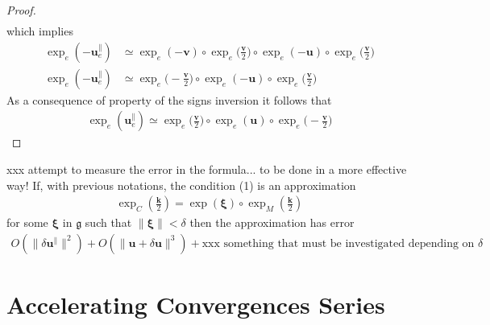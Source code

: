\begin{proof}
\begin{align*}
	\end{align*}
	which implies
	\begin{align*}
	\exp_{e}(-\mathbf{u}_{e}^{\parallel}) 
	&\simeq
	\exp_{e}(-\mathbf{v}) 
	\circ \exp_{e}\big(\frac{\mathbf{v}}{2}\big)   
	\circ  \exp_{e}(-\mathbf{u}) 
	\circ \exp_{e}\big(\frac{\mathbf{v}}{2}\big)
	\\
	\exp_{e}(-\mathbf{u}_{e}^{\parallel}) 
	&\simeq
	\exp_{e}\big(-\frac{\mathbf{v}}{2}\big)   
	\circ  \exp_{e}(-\mathbf{u}) 
	\circ \exp_{e}\big(\frac{\mathbf{v}}{2}\big)
	\end{align*}
	As a consequence of property of the signs inversion it follows that
	\begin{align*}
	\exp_{e}(\mathbf{u}_{e}^{\parallel}) 
	\simeq
	\exp_{e}\big(\frac{\mathbf{v}}{2}\big)   
	\circ  \exp_{e}(\mathbf{u}) 
	\circ \exp_{e}\big(-\frac{\mathbf{v}}{2}\big)
	\end{align*}
\end{proof} 

\begin{corollary}
	xxx attempt to measure the error in the formula... to be done in a more effective way!
	If, with previous notations, the condition (1) is an approximation
	\begin{align*}
	\exp_{C}(\frac{\mathbf{k}}{2}) = \exp(\mathbf{\xi})\circ \exp_{M}(\frac{\mathbf{k}}{2}) 
	\end{align*}
	for some $ \mathbf{\xi}$ in  $\mathfrak{g}$ such that $\parallel\mathbf{\xi} \parallel < \delta$
	then the approximation has error
	\begin{align*}
	O(\parallel \delta\mathbf{u}^{\parallel} \parallel^{2} )  
	+ O(\parallel \mathbf{u} + \delta\mathbf{u}\parallel^{3})
	+ \text{xxx something that must be investigated depending on } \delta
	\end{align*}
\end{corollary}




\section{Accelerating Convergences Series}\label{ch:accelerating}


